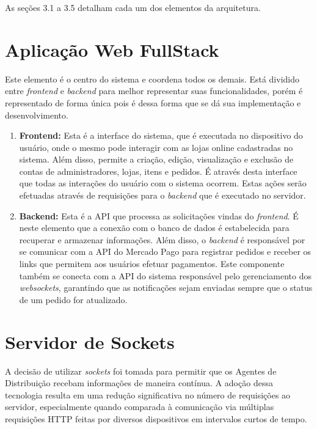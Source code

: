 As seções 3.1 a 3.5 detalham cada um dos elementos da arquitetura. 

\section{Aplicação Web FullStack}
Este elemento é o centro do sistema e coordena todos os demais. Está dividido entre \textit{frontend} e \textit{backend} para melhor representar suas funcionalidades, porém é representado de forma única pois é dessa forma que se dá sua implementação e desenvolvimento.

\begin{enumerate}

\item \textbf{Frontend:} Esta é a interface do sistema, que é executada no dispositivo do usuário, onde o mesmo pode interagir com as lojas online cadastradas no sistema. Além disso, permite a criação, edição, visualização e exclusão de contas de administradores, lojas, itens e pedidos. É através desta interface que todas as interações do usuário com o sistema ocorrem. Estas ações serão efetuadas através de requisições para o \textit{backend} que é executado no servidor.
\item \textbf{Backend:} Esta é a \gls{API} que processa as solicitações vindas do \textit{frontend}. É neste elemento que a conexão com o banco de dados é estabelecida para recuperar e armazenar informações. Além disso, o \textit{backend} é responsável por se comunicar com a API do Mercado Pago para registrar pedidos e receber os links que permitem aos usuários efetuar pagamentos. Este componente também se conecta com a API do sistema responsável pelo gerenciamento dos \textit{websockets}, garantindo que as notificações sejam enviadas sempre que o status de um pedido for atualizado.
\end{enumerate}

\section{Servidor de Sockets}

A decisão de utilizar \textit{sockets} foi tomada para permitir que os Agentes de Distribuição recebam informações de maneira contínua. A adoção dessa tecnologia resulta em uma redução significativa no número de requisições ao servidor, especialmente quando comparada à comunicação via múltiplas requisições HTTP feitas por diversos dispositivos em intervalos curtos de tempo.

